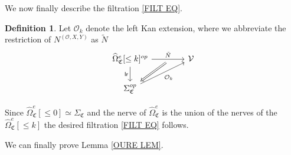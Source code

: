 \documentclass[a4paper,10pt
,draft
]{article}%
\numberwithin{equation}{section}
\numberwithin{figure}{section}
\theoremstyle{definition} %
\newtheorem{definition}[equation]{Definition}%
\newcommand{\V}{\ensuremath{\mathcal V}}
\renewcommand{\O}{\ensuremath{\mathcal O}}
\newcommand{\1}{\ensuremath{\mathbbm 1}}%
\newcommand{\SC}{\Sigma_{\mathfrak C}}
\begin{document}
We now finally describe the filtration \eqref{FILT EQ}.
\begin{definition}\label{FILTSTAGE DEF}
Let $\O_k$ denote the left Kan extension, 
where we abbreviate the restriction of $N^{(\O,X,Y)}$ as $\tilde{N}$
\begin{equation}
\begin{tikzcd}[column sep = 40pt]
	\widehat\Omega_{\mathfrak C}^e[\leq k]^{op}
	\ar{r}{\tilde N}[swap,name = A]{} \arrow[d, "\mathsf{lr}"']
&
	\V
\\
	|[alias = B]|
	\SC^{op}
	\arrow[ur, "\O_k"']
	\arrow[Rightarrow, from = A, to = B]
\end{tikzcd}
\end{equation}
\end{definition}

Since $\widehat\Omega_{\mathfrak C}^e[\leq 0] \simeq \SC$
and the nerve of $\widehat \Omega_{\mathfrak C}^e$ is the union of the nerves of the $\widehat\Omega_{\mathfrak C}^e[\leq k]$
the desired filtration \eqref{FILT EQ} follows.



We can finally prove Lemma \ref{OURE LEM}.
\end{document}
